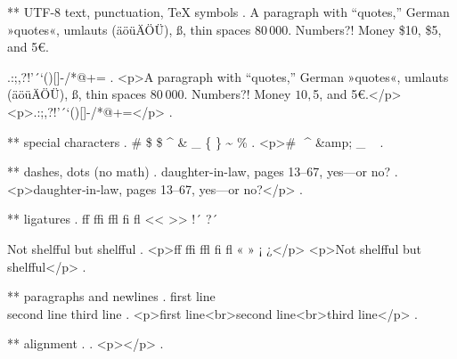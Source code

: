 ** UTF-8 text, punctuation, TeX symbols
.
A paragraph with “quotes,” German »quotes«, umlauts (äöüÄÖÜ), ß, thin spaces 80\,000. Numbers?! Money \$10, \$5, and 5€.

.:;,?!'´`()[]-/*@+=
.
<p>A paragraph with “quotes,” German »quotes«, umlauts (äöüÄÖÜ), ß, thin spaces 80 000. Numbers?! Money $10, $5, and 5€.</p>
<p>.:;,?!'´`()[]-/*@+=</p>
.


** special characters
.
\# \$ \$ \^{} \& \_ \{ \} \~{} \%
.
<p># $ $ ^ &amp; _ { } ~ %
.


** dashes, dots (no math)
.
daughter-in-law, pages 13--67, yes---or no?
.
<p>daughter‐in‐law, pages 13–67, yes—or no?</p>
.


** ligatures
.
ff ffi ffl fi fl << >> !´ ?´

Not shelfful but shelf\mbox{}ful
.
<p>ﬀ ﬃ ﬄ ﬁ ﬂ « » ¡ ¿</p>
<p>Not shelﬀul but shelfful</p>
.


** paragraphs and newlines
.
first line\\
second line\newline
third line
.
<p>ﬁrst line<br>second line<br>third line</p>
.


** alignment
.
.
<p></p>
.
